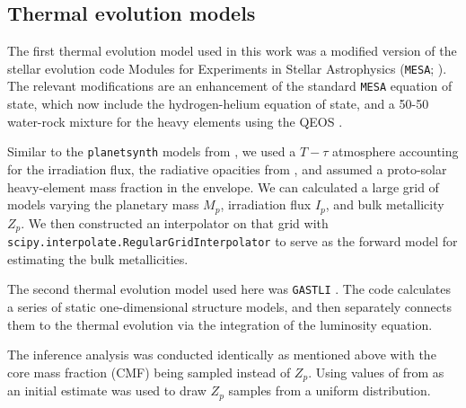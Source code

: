 \documentclass{aa}
\begin{document}
\subsection{Thermal evolution models}\label{sec:thermal_evolution_models}
The first thermal evolution model used in this work was a modified version \citep{helled_giant_2025} of the stellar evolution code Modules for Experiments in Stellar Astrophysics (\texttt{MESA}; \citet{paxton_modules_2011,paxton_modules_2013,paxton_modules_2018,paxton_modules_2019,jermyn_modules_2023}). The relevant modifications are an enhancement of the standard \texttt{MESA} equation of state, which now include the \citet{chabrier_new_2021} hydrogen-helium equation of state, and a 50-50 water-rock mixture for the heavy elements using the QEOS \citep{more_new_1988,vazan_effect_2013}.

Similar to the \texttt{planetsynth} models from \citet{muller_synthetic_2021}, we used a $T-\tau$ atmosphere accounting for the irradiation flux, the radiative opacities from \citet{freedman_gaseous_2014}, and assumed a proto-solar heavy-element mass fraction in the envelope. We can calculated a large grid of models varying the planetary mass $M_p$, irradiation flux $I_p$, and bulk metallicity $Z_p$. We then constructed an interpolator on that grid with \texttt{scipy.interpolate.RegularGridInterpolator} to serve as the forward model for estimating the bulk metallicities. 

The second thermal evolution model used here was \texttt{GASTLI} \citep{acuna_gastli_2024}. The code calculates a series of static one-dimensional structure models, and then separately connects them to the thermal evolution via the integration of the luminosity equation. 

The inference analysis was conducted identically as mentioned above with the core mass fraction (CMF) being sampled instead of $Z_p$. Using values of from \cite{muller_bulk_2025} as an initial estimate was used to draw $Z_p$ samples from a uniform distribution.

\end{document}

